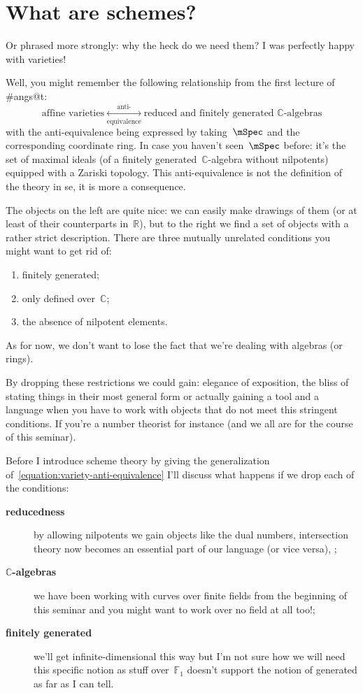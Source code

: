 \section{What are schemes?}

Or phrased more strongly: why the heck do we need them? I was perfectly happy with varieties!

Well, you might remember the following relationship from the first lecture of \#angs@t:
\begin{equation}
  \text{affine varieties} \underset{\text{equivalence}}{\overset{\text{anti-}}{\longleftrightarrow}} \text{reduced and finitely generated $\mathbb{C}$-algebras}
  \label{equation:variety-anti-equivalence}
\end{equation}
with the anti-equivalence being expressed by taking~$\mSpec$ and the corresponding coordinate ring. In case you haven't seen~$\mSpec$ before: it's the set of maximal ideals (of a finitely generated~$\mathbb{C}$-algebra without nilpotents) equipped with a Zariski topology. This anti-equivalence is not the definition of the theory in se, it is more a consequence.

The objects on the left are quite nice: we can easily make drawings of them (or at least of their counterparts in~$\mathbb{R}$), but to the right we find a set of objects with a rather strict description. There are three mutually unrelated conditions you might want to get rid of:
\begin{enumerate}
  \item finitely generated;
  \item only defined over~$\mathbb{C}$;
  \item the absence of nilpotent elements.
\end{enumerate}
As for now, we don't want to lose the fact that we're dealing with algebras (or rings).

By dropping these restrictions we could gain: elegance of exposition, the bliss of stating things in their most general form or actually gaining a tool and a language when you have to work with objects that do not meet this stringent conditions. If you're a number theorist for instance (and we all are for the course of this seminar).

Before I introduce scheme theory by giving the generalization of~\eqref{equation:variety-anti-equivalence} I'll discuss what happens if we drop each of the conditions:
\begin{description}
  \item[\textbf{reducedness}] by allowing nilpotents we gain objects like the dual numbers, intersection theory now becomes an essential part of our language (or vice versa), ;
  \item[\textbf{$\mathbb{C}$-algebras}] we have been working with curves over finite fields from the beginning of this seminar and you might want to work over no field at all too!;
  \item[\textbf{finitely generated}] we'll get infinite-dimensional this way but I'm not sure how we will need this specific notion as stuff over~$\mathbb{F}_1$ doesn't support the notion of generated as far as I can tell.
\end{description}

